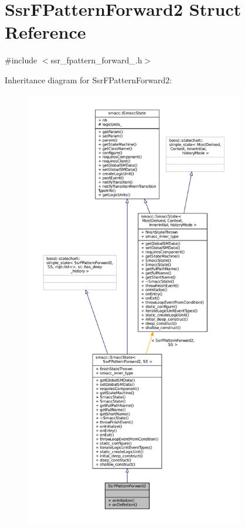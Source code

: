 \hypertarget{structSsrFPatternForward2}{}\section{Ssr\+F\+Pattern\+Forward2 Struct Reference}
\label{structSsrFPatternForward2}


{\ttfamily \#include $<$ssr\+\_\+fpattern\+\_\+forward\+\_.\+h$>$}



Inheritance diagram for Ssr\+F\+Pattern\+Forward2\+:
\nopagebreak
\begin{figure}[H]
\begin{center}
\leavevmode
\includegraphics[height=550pt]{structSsrFPatternForward2__inherit__graph}
\end{center}
\end{figure}


